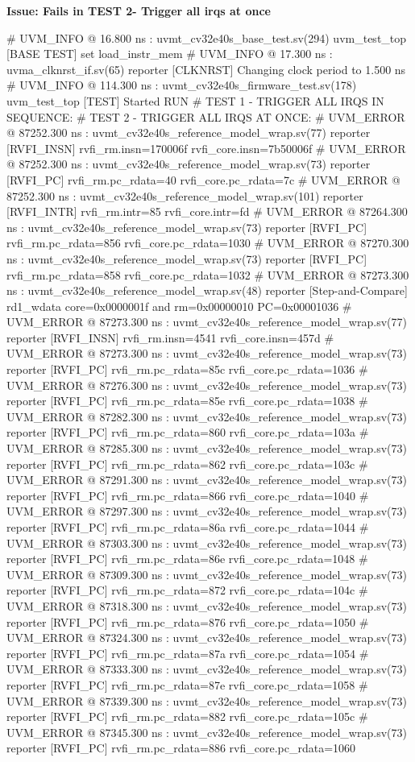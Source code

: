 \textbf{Issue: Fails in TEST 2- Trigger all irqs at once}

\begin{terminal}
# UVM_INFO @ 16.800 ns : uvmt_cv32e40s_base_test.sv(294) uvm_test_top [BASE TEST] set load_instr_mem
# UVM_INFO @ 17.300 ns : uvma_clknrst_if.sv(65) reporter [CLKNRST] Changing clock period to 1.500 ns
# UVM_INFO @ 114.300 ns : uvmt_cv32e40s_firmware_test.sv(178) uvm_test_top [TEST] Started RUN
# TEST 1 - TRIGGER ALL IRQS IN SEQUENCE:
# TEST 2 - TRIGGER ALL IRQS AT ONCE:
# UVM_ERROR @ 87252.300 ns : uvmt_cv32e40s_reference_model_wrap.sv(77) reporter [RVFI_INSN] rvfi_rm.insn=170006f rvfi_core.insn=7b50006f
# UVM_ERROR @ 87252.300 ns : uvmt_cv32e40s_reference_model_wrap.sv(73) reporter [RVFI_PC] rvfi_rm.pc_rdata=40 rvfi_core.pc_rdata=7c
# UVM_ERROR @ 87252.300 ns : uvmt_cv32e40s_reference_model_wrap.sv(101) reporter [RVFI_INTR] rvfi_rm.intr=85 rvfi_core.intr=fd
# UVM_ERROR @ 87264.300 ns : uvmt_cv32e40s_reference_model_wrap.sv(73) reporter [RVFI_PC] rvfi_rm.pc_rdata=856 rvfi_core.pc_rdata=1030
# UVM_ERROR @ 87270.300 ns : uvmt_cv32e40s_reference_model_wrap.sv(73) reporter [RVFI_PC] rvfi_rm.pc_rdata=858 rvfi_core.pc_rdata=1032
# UVM_ERROR @ 87273.300 ns : uvmt_cv32e40s_reference_model_wrap.sv(48) reporter [Step-and-Compare] rd1_wdata core=0x0000001f and rm=0x00000010 PC=0x00001036
# UVM_ERROR @ 87273.300 ns : uvmt_cv32e40s_reference_model_wrap.sv(77) reporter [RVFI_INSN] rvfi_rm.insn=4541 rvfi_core.insn=457d
# UVM_ERROR @ 87273.300 ns : uvmt_cv32e40s_reference_model_wrap.sv(73) reporter [RVFI_PC] rvfi_rm.pc_rdata=85c rvfi_core.pc_rdata=1036
# UVM_ERROR @ 87276.300 ns : uvmt_cv32e40s_reference_model_wrap.sv(73) reporter [RVFI_PC] rvfi_rm.pc_rdata=85e rvfi_core.pc_rdata=1038
# UVM_ERROR @ 87282.300 ns : uvmt_cv32e40s_reference_model_wrap.sv(73) reporter [RVFI_PC] rvfi_rm.pc_rdata=860 rvfi_core.pc_rdata=103a
# UVM_ERROR @ 87285.300 ns : uvmt_cv32e40s_reference_model_wrap.sv(73) reporter [RVFI_PC] rvfi_rm.pc_rdata=862 rvfi_core.pc_rdata=103c
# UVM_ERROR @ 87291.300 ns : uvmt_cv32e40s_reference_model_wrap.sv(73) reporter [RVFI_PC] rvfi_rm.pc_rdata=866 rvfi_core.pc_rdata=1040
# UVM_ERROR @ 87297.300 ns : uvmt_cv32e40s_reference_model_wrap.sv(73) reporter [RVFI_PC] rvfi_rm.pc_rdata=86a rvfi_core.pc_rdata=1044
# UVM_ERROR @ 87303.300 ns : uvmt_cv32e40s_reference_model_wrap.sv(73) reporter [RVFI_PC] rvfi_rm.pc_rdata=86e rvfi_core.pc_rdata=1048
# UVM_ERROR @ 87309.300 ns : uvmt_cv32e40s_reference_model_wrap.sv(73) reporter [RVFI_PC] rvfi_rm.pc_rdata=872 rvfi_core.pc_rdata=104c
# UVM_ERROR @ 87318.300 ns : uvmt_cv32e40s_reference_model_wrap.sv(73) reporter [RVFI_PC] rvfi_rm.pc_rdata=876 rvfi_core.pc_rdata=1050
# UVM_ERROR @ 87324.300 ns : uvmt_cv32e40s_reference_model_wrap.sv(73) reporter [RVFI_PC] rvfi_rm.pc_rdata=87a rvfi_core.pc_rdata=1054
# UVM_ERROR @ 87333.300 ns : uvmt_cv32e40s_reference_model_wrap.sv(73) reporter [RVFI_PC] rvfi_rm.pc_rdata=87e rvfi_core.pc_rdata=1058
# UVM_ERROR @ 87339.300 ns : uvmt_cv32e40s_reference_model_wrap.sv(73) reporter [RVFI_PC] rvfi_rm.pc_rdata=882 rvfi_core.pc_rdata=105c
# UVM_ERROR @ 87345.300 ns : uvmt_cv32e40s_reference_model_wrap.sv(73) reporter [RVFI_PC] rvfi_rm.pc_rdata=886 rvfi_core.pc_rdata=1060


\end{terminal}
